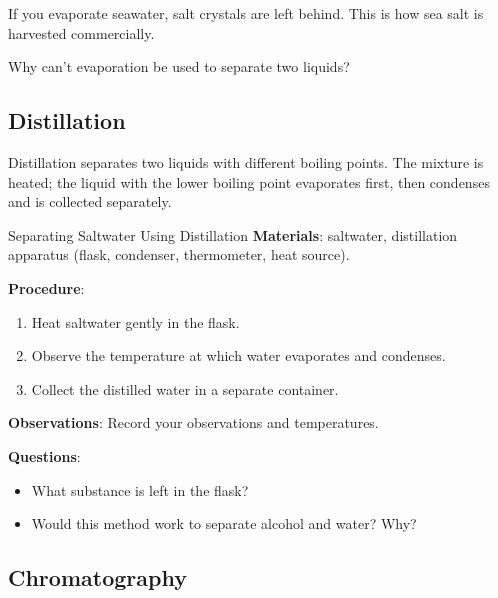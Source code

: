 \begin{example}
If you evaporate seawater, salt crystals are left behind. This is how sea salt is harvested commercially.
\end{example}

\begin{stopandthink}
Why can't evaporation be used to separate two liquids?
\end{stopandthink}

\subsection{Distillation}

\begin{keyconcept}{Distillation}
 separates two liquids with different boiling points. The mixture is heated; the liquid with the lower boiling point evaporates first, then condenses and is collected separately.
\end{keyconcept}


\begin{investigation}{Separating Saltwater Using Distillation}
\textbf{Materials}: saltwater, distillation apparatus (flask, condenser, thermometer, heat source).

\textbf{Procedure}:
\begin{enumerate}
\item Heat saltwater gently in the flask.
\item Observe the temperature at which water evaporates and condenses.
\item Collect the distilled water in a separate container.
\end{enumerate}

\textbf{Observations}: Record your observations and temperatures.

\textbf{Questions}:
\begin{itemize}
\item What substance is left in the flask?
\item Would this method work to separate alcohol and water? Why?
\end{itemize}
\end{investigation}

\subsection{Chromatography}

